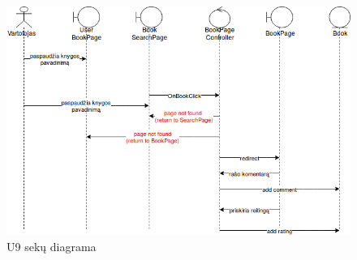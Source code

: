 \documentclass{VUMIFPSkursinis}
\begin{document}
\begin{enumerate}[label=\textbf{U\arabic*.}]
\begin{figure}[H]
					\includegraphics[scale=0.6]{img/9seq.png}
					\caption{U9 sekų diagrama}
					\label{img:psi2-u9-sequence}
				\end{figure}


\end{enumerate}
\end{document}

